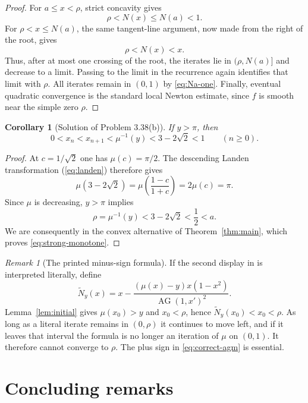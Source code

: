\documentclass[11pt]{article}
\newtheorem{corollary}[theorem]{Corollary}
\theoremstyle{remark}
\newtheorem{remark}[theorem]{Remark}
\newcommand{\M}{\operatorname{AG}}
\begin{document}
\begin{proof}
For $a\le x<\rho$, strict concavity gives
\begin{equation}\label{eq:left-concave}
              \rho<N(x)\le N(a)<1.
\end{equation}
For $\rho<x\le N(a)$, the same tangent-line argument, now made from the
right of the root, gives
\begin{equation}\label{eq:right-concave}
              \rho<N(x)<x.
\end{equation}
Thus, after at most one crossing of the root, the iterates lie in
$(\rho,N(a)]$ and decrease to a limit.  Passing to the limit in the
recurrence again identifies that limit with $\rho$.  All iterates remain in
$(0,1)$ by \eqref{eq:Na-one}.  Finally, eventual quadratic convergence is the
standard local Newton estimate, since $f$ is smooth near the simple zero
$\rho$.
\end{proof}

\begin{corollary}[Solution of Problem 3.38(b)]\label{cor:monotone}
If $y>\pi$, then
\begin{equation}\label{eq:strong-monotone}
 0<x_n<x_{n+1}<\mu^{-1}(y)<3-2\sqrt2<1
 \qquad(n\ge0).
\end{equation}
\end{corollary}

\begin{proof}
At $c=1/\sqrt2$ one has $\mu(c)=\pi/2$.  The descending Landen
transformation (\ref{eq:landen}) therefore gives
\[
 \mu(3-2\sqrt2)
 =\mu\!\left(\frac{1-c}{1+c}\right)
 =2\mu(c)=\pi.
\]
Since $\mu$ is decreasing, $y>\pi$ implies
\[
 \rho=\mu^{-1}(y)<3-2\sqrt2<\frac12<a.
\]
We are consequently in the convex alternative of
Theorem~\ref{thm:main}, which proves \eqref{eq:strong-monotone}.
\end{proof}

\begin{remark}[The printed minus-sign formula]
If the second display in \cite[Section 3.37]{VuorinenSurvey} is interpreted
literally, define
\[
 \widetilde N_y(x)=x-
 \frac{(\mu(x)-y)x(1-x^2)}{\M(1,x')^2}.
\]
Lemma~\ref{lem:initial} gives $\mu(x_0)>y$ and $x_0<\rho$, hence
$\widetilde N_y(x_0)<x_0<\rho$.  As long as a literal iterate remains in
$(0,\rho)$ it continues to move left, and if it leaves that interval the
formula is no longer an iteration of $\mu$ on $(0,1)$.  It therefore cannot
converge to $\rho$.  The plus sign in \eqref{eq:correct-agm} is essential.
\end{remark}

\section{Concluding remarks}
\end{document}

